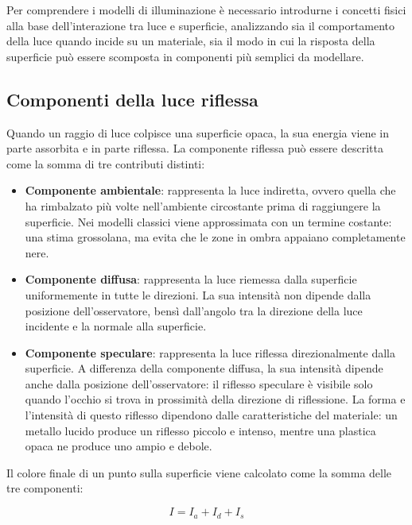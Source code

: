\documentclass[12pt,a4paper,twoside]{book}
\begin{document}
Per comprendere i modelli di illuminazione è necessario introdurne i concetti fisici alla base dell'interazione tra luce e superficie, analizzando sia il comportamento della luce quando incide su un materiale, sia il modo in cui la risposta della superficie può essere scomposta in componenti più semplici da modellare.

\subsection{Componenti della luce riflessa}
\label{subsec:componenti-riflessione}

Quando un raggio di luce colpisce una superficie opaca, la sua energia viene in parte assorbita e in parte riflessa. La componente riflessa può essere descritta come la somma di tre contributi distinti:

\begin{itemize}
    \item \textbf{Componente ambientale}: rappresenta la luce indiretta, ovvero quella che ha rimbalzato più volte nell'ambiente circostante prima di raggiungere la superficie. Nei modelli classici viene approssimata con un termine costante: una stima grossolana, ma evita che le zone in ombra appaiano completamente nere.

    \item \textbf{Componente diffusa}: rappresenta la luce riemessa dalla superficie uniformemente in tutte le direzioni. La sua intensità non dipende dalla posizione dell'osservatore, bensì dall'angolo tra la direzione della luce incidente e la normale alla superficie.

    \item \textbf{Componente speculare}: rappresenta la luce riflessa direzionalmente dalla superficie. A differenza della componente diffusa, la sua intensità dipende anche dalla posizione dell'osservatore: il riflesso speculare è visibile solo quando l'occhio si trova in prossimità della direzione di riflessione. La forma e l'intensità di questo riflesso dipendono dalle caratteristiche del materiale: un metallo lucido produce un riflesso piccolo e intenso, mentre una plastica opaca ne produce uno ampio e debole.
\end{itemize}

Il colore finale di un punto sulla superficie viene calcolato come la somma delle tre componenti:

\begin{equation}
    I = I_a + I_d + I_s
    \label{eq:illuminazione-totale}
\end{equation}
\end{document}
